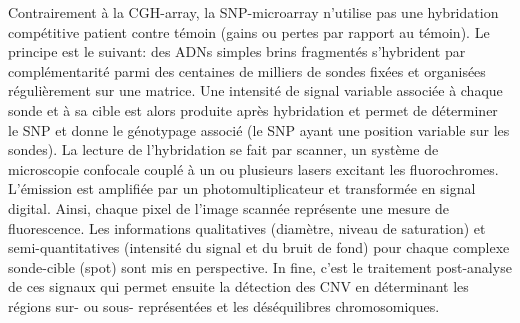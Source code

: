 \documentclass{style}
\begin{document}
Contrairement à la CGH-array, la SNP-microarray n’utilise pas une hybridation compétitive patient contre témoin (gains ou pertes par rapport au témoin). Le principe est le suivant: des ADNs simples brins fragmentés s’hybrident par complémentarité parmi des centaines de milliers de sondes fixées et organisées régulièrement sur une matrice. Une intensité de signal variable associée à chaque sonde et à sa cible est alors produite après hybridation et permet de déterminer le SNP et donne le génotypage associé (le SNP ayant une position variable sur les sondes). La lecture de l’hybridation se fait par scanner, un système de microscopie confocale couplé à un ou plusieurs lasers excitant les fluorochromes. L’émission est amplifiée par un photomultiplicateur et transformée en signal digital. Ainsi, chaque pixel de l’image scannée représente une mesure de fluorescence. Les informations qualitatives (diamètre, niveau de saturation) et semi-quantitatives (intensité du signal et du bruit de fond) pour chaque complexe sonde-cible (spot) sont mis en perspective.  In fine, c'est le traitement post-analyse de ces signaux qui permet ensuite la détection des CNV en déterminant les régions sur- ou sous- représentées et les déséquilibres chromosomiques.
\end{document}
